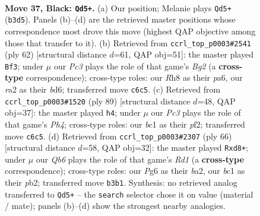 \documentclass[11pt]{article}
\begin{document}
\clearpage

\begin{figure}[p]\centering
\begin{subfigure}{0.46\textwidth}\centering
\resizebox{\linewidth}{!}{%
\newchessgame
\chessboard[
  setfen={7r/r3k3/1pp1p1pp/6P1/Pp1PK3/1q2P3/R4Q2/2B5 b - - 1 37},
  showmover=false,
  pgfstyle=straightmove, color=movearrow, markmove={b3-d5}
]}
\caption{}
\end{subfigure}\hfill
\begin{subfigure}{0.46\textwidth}\centering
\resizebox{\linewidth}{!}{%
\newchessgame
\chessboard[
  setfen={6k1/2q2p1p/p2b1Qp1/1p2r2P/3p4/1P4P1/P4PB1/3R2K1 w - - 0 32},
  showmover=false,
  pgfstyle=straightmove, color=movearrow, markmove={g2-f3}
]}
\caption{}
\end{subfigure}
\\[4pt]
\begin{subfigure}{0.46\textwidth}\centering
\resizebox{\linewidth}{!}{%
\newchessgame
\chessboard[
  setfen={8/5p2/2r3k1/p1P3pp/4p3/P2q2PP/2R2P1K/2Q5 b - - 3 45},
  showmover=false,
  pgfstyle=straightmove, color=movearrow, markmove={h5-h4}
]}
\caption{}
\end{subfigure}\hfill
\begin{subfigure}{0.46\textwidth}\centering
\resizebox{\linewidth}{!}{%
\newchessgame
\chessboard[
  setfen={3r2k1/1P3pp1/7p/2q1p2Q/1p2P3/8/bpP2PPP/3R2K1 w - - 0 34},
  showmover=false,
  pgfstyle=straightmove, color=movearrow, markmove={d1-d8}
]}
\caption{}
\end{subfigure}
\caption{\textbf{Move 37, Black: \texttt{Qd5+}.} (a) Our position; Melanie plays \texttt{Qd5+} (\texttt{b3d5}). Panels (b)--(d) are the retrieved master positions whose correspondence most drove this move (highest QAP objective among those that transfer to it). (b) Retrieved from \texttt{ccrl\_top\_p0003\#2541} (ply 62) [structural distance $d$=61, QAP obj=51]: the master played \texttt{Bf3}; under $\mu$ our \emph{Pc3} plays the role of that game's \emph{Bg2} (a \textbf{cross-type} correspondence); cross-type roles: our \emph{R}h8 as their \emph{p}a6, our \emph{r}a2 as their \emph{b}d6; transferred move \texttt{c6c5}. (c) Retrieved from \texttt{ccrl\_top\_p0003\#1520} (ply 89) [structural distance $d$=48, QAP obj=37]: the master played \texttt{h4}; under $\mu$ our \emph{Pc3} plays the role of that game's \emph{Ph4}; cross-type roles: our \emph{b}c1 as their \emph{p}f2; transferred move \texttt{c6c5}. (d) Retrieved from \texttt{ccrl\_top\_p0003\#2307} (ply 66) [structural distance $d$=58, QAP obj=32]: the master played \texttt{Rxd8+}; under $\mu$ our \emph{Qb6} plays the role of that game's \emph{Rd1} (a \textbf{cross-type} correspondence); cross-type roles: our \emph{P}g6 as their \emph{b}a2, our \emph{b}c1 as their \emph{p}b2; transferred move \texttt{b3b1}. Synthesis: no retrieved analog transferred to \texttt{Qd5+} -- the \texttt{search} selector chose it on value (material / mate); panels (b)--(d) show the strongest nearby analogies.}
\label{fig:thought-m73}
\end{figure}
\end{document}
